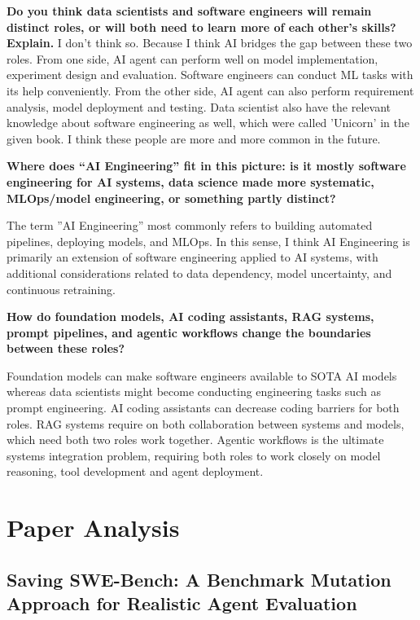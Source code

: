 \documentclass[11pt]{article}
\begin{document}
\textbf{Do you think data scientists and software engineers will remain distinct roles, or will both need to learn more of each other’s skills? Explain.} 
I don't think so. Because I think AI bridges the gap between these two roles. From one side, AI agent can perform well on model implementation, experiment design and evaluation. Software engineers can conduct ML tasks with its help conveniently. From the other side, AI agent can also perform requirement analysis, model deployment and testing. Data scientist also have the relevant knowledge about software engineering as well, which were called 'Unicorn' in the given book. I think these people are more and more common in the future. 

\textbf{Where does “AI Engineering” fit in this picture: is it mostly software engineering for AI systems, data science made more systematic, MLOps/model engineering, or something partly distinct?}

The term ”AI Engineering” most commonly refers to building automated pipelines, deploying
models, and MLOps. In this sense, I think AI Engineering is primarily an extension of software engineering applied to AI systems, with additional considerations related to data dependency, model uncertainty, and continuous retraining.


\textbf{How do foundation models, AI coding assistants, RAG systems, prompt pipelines, and agentic workflows change the boundaries between these roles?}

Foundation models can make software engineers available to SOTA AI models whereas data scientists might become conducting engineering tasks such as prompt engineering. 
AI coding assistants can decrease coding barriers for both roles.
RAG systems require on both collaboration between systems and models, which need both two roles work together.
Agentic workflows is the ultimate systems integration problem, requiring both roles to work closely on model reasoning, tool development and  agent deployment. 

\section{Paper Analysis}


\subsection{Saving SWE-Bench: A Benchmark Mutation Approach for  Realistic Agent Evaluation}
\end{document}
